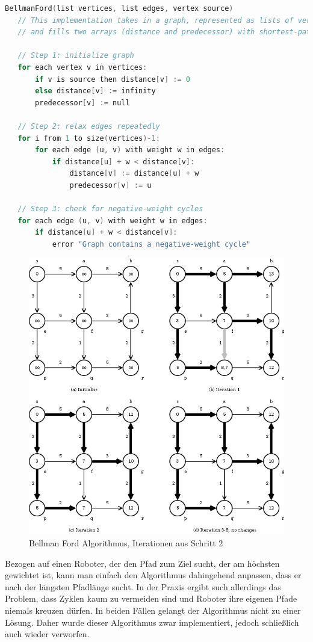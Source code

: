 \documentclass{article}
\begin{document}
\begin{lstlisting}[frame=single, language=C]
BellmanFord(list vertices, list edges, vertex source)
   // This implementation takes in a graph, represented as lists of vertices and edges,
   // and fills two arrays (distance and predecessor) with shortest-path information

   // Step 1: initialize graph
   for each vertex v in vertices:
       if v is source then distance[v] := 0
       else distance[v] := infinity
       predecessor[v] := null

   // Step 2: relax edges repeatedly
   for i from 1 to size(vertices)-1:
       for each edge (u, v) with weight w in edges:
           if distance[u] + w < distance[v]:
               distance[v] := distance[u] + w
               predecessor[v] := u

   // Step 3: check for negative-weight cycles
   for each edge (u, v) with weight w in edges:
       if distance[u] + w < distance[v]:
           error "Graph contains a negative-weight cycle"
\end{lstlisting}

\begin{figure}
  \includegraphics[width=.8\textwidth]{img/SSSP_BellmanFord.png}
  \caption{Bellman Ford Algorithmus, Iterationen aus Schritt 2}
\end{figure}

Bezogen auf einen Roboter, der den Pfad zum Ziel sucht, der am höchsten
gewichtet ist, kann man einfach den Algorithmus dahingehend anpassen, dass er
nach der längsten Pfadlänge sucht. In der Praxis ergibt such allerdings das
Problem, dass Zyklen kaum zu vermeiden sind und Roboter ihre eigenen Pfade
niemals kreuzen dürfen. In beiden Fällen gelangt der Algorithmus nicht zu einer
Lösung. Daher wurde dieser Algorithmus zwar implementiert, jedoch schließlich
auch wieder verworfen.
\end{document}
